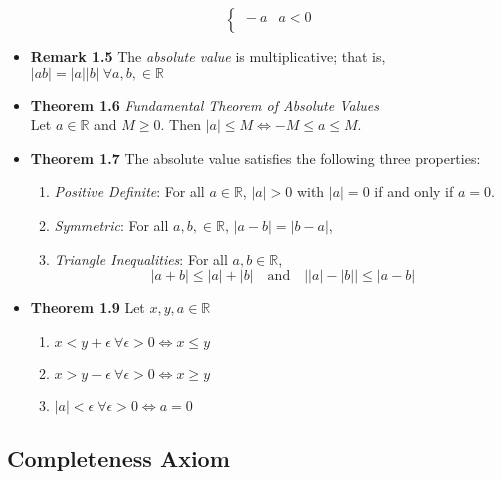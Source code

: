 \documentclass[11pt,a4paper]{article}
\begin{document}
\begin{itemize}
\[\begin{cases}{}
                -a & a < 0 \\
            \end{cases}
        \]
    \item \textbf{Remark 1.5} The \emph{absolute value} is multiplicative;
        that is, $|ab| = |a||b| \ \forall a, b, \in \mathbb{R}$
    \item \textbf{Theorem 1.6} \emph{Fundamental Theorem of Absolute Values} \\
        Let $a \in \mathbb{R}$ and $M \geq 0$.
        Then $|a| \leq M \iff -M \leq a \leq M$.
    \item \textbf{Theorem 1.7} The absolute value satisfies the following three properties:
        \begin{enumerate}
            \item \emph{Positive Definite}:
                For all $a \in \mathbb{R}$, $|a| > 0$ with $|a| = 0$ if and only if $a = 0$.
            \item \emph{Symmetric}:
                For all $a, b, \in \mathbb{R}$, $|a - b| = |b - a|$,
            \item \emph{Triangle Inequalities}:
                For all $a, b \in \mathbb{R}$,
                \[
                    |a + b| \leq |a| + |b| \quad \text{and}
                    \quad \left| |a| - |b| \right| \leq |a - b|
                \]
        \end{enumerate}
    \item \textbf{Theorem 1.9} Let $x, y, a \in \mathbb{R}$
        \begin{enumerate}
            \item $x < y + \epsilon \ \forall \epsilon > 0 \iff x \leq y$
            \item $x > y - \epsilon \ \forall \epsilon > 0 \iff x \geq y$
            \item $|a| < \epsilon \ \forall \epsilon > 0 \iff a = 0$
        \end{enumerate}
\end{itemize}

\subsection{Completeness Axiom}
\end{document}
